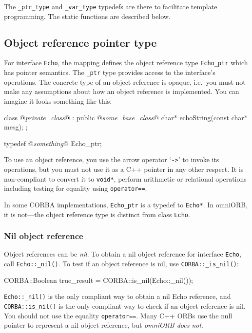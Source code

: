 \documentclass[11pt,oneside,a4paper]{book}
\newcommand{\type}[1]{\texttt{#1}}
\newcommand{\intf}[1]{\texttt{#1}}
\newcommand{\code}[1]{\texttt{#1}}
\newcommand{\op}[1]{\texttt{#1()}}
\begin{document}
The \type{\_ptr\_type} and \type{\_var\_type} typedefs are there to
facilitate template programming. The static functions are described
below.


\subsection{Object reference pointer type}

For interface \intf{Echo}, the mapping defines the object reference
type \type{Echo\_ptr} which has pointer semantics. The \type{\_ptr}
type provides access to the interface's operations. The concrete type
of an object reference is opaque, i.e.\ you must not make any
assumptions about how an object reference is implemented. You can
imagine it looks something like this:

\begin{cxxlisting}
class @\textit{private\_class}@ : public @\textit{some\_base\_class}@ {
  char* echoString(const char* mesg);
};

typedef @\textit{something}@ Echo_ptr;
\end{cxxlisting}

To use an object reference, you use the arrow operator `\code{->}' to
invoke its operations, but you must not use it as a C++ pointer in any
other respect. It is non-compliant to convert it to \type{void*},
perform arithmetic or relational operations including testing for
equality using \code{operator==}.

In some CORBA implementations, \type{Echo\_ptr} is a typedef to
\type{Echo*}. In omniORB, it is not---the object reference type is
distinct from class \type{Echo}.


\subsubsection{Nil object reference}

Object references can be \emph{nil}. To obtain a nil object reference
for interface \type{Echo}, call \op{Echo::\_nil}. To test if an
object reference is nil, use \op{CORBA::\_is\_nil}:

\begin{cxxlisting}
CORBA::Boolean true_result = CORBA::is_nil(Echo::_nil());
\end{cxxlisting}

\op{Echo::\_nil} is the only compliant way to obtain a nil Echo
reference, and \op{CORBA::is\_nil} is the only compliant way to check
if an object reference is nil. You should not use the equality
\code{operator==}. Many C++ ORBs use the null pointer to represent a
nil object reference, but \emph{omniORB does not}.
\end{document}
